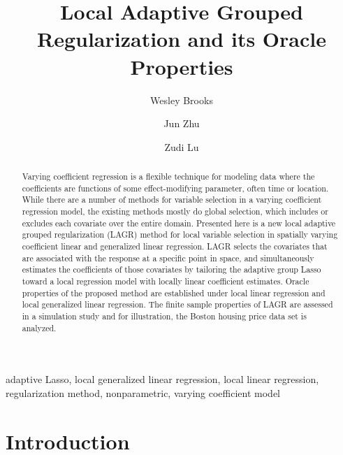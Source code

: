 \documentclass[authoryear,review, 12pt]{elsarticle}
\begin{document}
\begin{frontmatter}

\title{Local Adaptive Grouped Regularization and its Oracle Properties}


\author[wrbrooks]{Wesley Brooks}

\author[jzhu]{Jun Zhu}

\author[zlu]{Zudi Lu}

\address[wrbrooks]{Department of Statistics, University of Wisconsin, Madison, WI 53706}
\address[jzhu]{Department of Statistics and Department of Entomology, University of Wisconsin, Madison, WI 53706}
\address[zlu]{School of Mathematical Sciences, The University of Southampton, Highfield, Southampton UK}

\begin{abstract}
Varying coefficient regression is a flexible technique for modeling data where the coefficients are functions of some effect-modifying parameter, often time or location. While there are a number of methods for variable selection in a varying coefficient regression model, the existing methods mostly do global selection, which includes or excludes each covariate over the entire domain. Presented here is a new local adaptive grouped regularization (LAGR) method for local variable selection in spatially varying coefficient linear and generalized linear regression. LAGR selects the covariates that are associated with the response at a specific point in space, and simultaneously estimates the coefficients of those covariates by tailoring the adaptive group Lasso toward a local regression model with locally linear coefficient estimates. Oracle properties of the proposed method are established under local linear regression and local generalized linear regression. The finite sample properties of LAGR are assessed in a simulation study and for illustration, the Boston housing price data set is analyzed.
\end{abstract}

\begin{keyword}
adaptive Lasso, local generalized linear regression, local linear regression, regularization method, nonparametric, varying coefficient model\end{keyword}

\end{frontmatter}

\section{Introduction}
\end{document}
